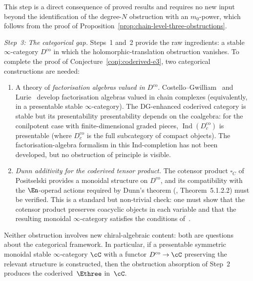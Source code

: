 \begin{remark}
This step is a direct consequence of proved results and requires
no new input beyond the identification of the degree-$N$ obstruction
with an $m_0$-power, which follows from the proof of
Proposition~\ref{prop:chain-level-three-obstructions}.

\emph{Step~3: The categorical gap.}
Steps~1 and~2 provide the raw ingredients:
a stable $\infty$-category $D^{\mathrm{co}}$ in which the
holomorphic-translation obstruction vanishes.
To complete the proof of Conjecture~\ref{conj:coderived-e3}, two
categorical constructions are needed:
\begin{enumerate}[label=\textup{(\alph*)}]
\item A theory of \emph{factorisation algebras valued in
 $D^{\mathrm{co}}$}. Costello--Gwilliam~\cite{CG17}
 and Lurie~\cite{HA} develop factorisation algebras valued in
 chain complexes (equivalently, in a presentable stable
 $\infty$-category). The DG-enhanced coderived category is
 stable but its presentability
 presentability depends on the coalgebra: for the conilpotent case with
 finite-dimensional graded pieces, $\operatorname{Ind}(D^{\mathrm{co}}_c)$ is
 presentable (where $D^{\mathrm{co}}_c$ is the full subcategory of
 compact objects). The factorisation-algebra formalism in
 this Ind-completion has not been developed, but no
 obstruction of principle is visible.
\item \emph{Dunn additivity for the coderived tensor product.}
 The cotensor product
 $\square_C$ of Positselski provides a monoidal structure on
 $D^{\mathrm{co}}$, and its compatibility with the
 $\En$-operad actions required by Dunn's theorem
 (\cite{HA}, Theorem~5.1.2.2) must be verified. This is a
 standard but non-trivial check: one must show that the
 cotensor product preserves coacyclic objects in each variable
 and that the resulting monoidal $\infty$-category satisfies
 the conditions of~\cite[Remark~5.1.2.4]{HA}.
\end{enumerate}
Neither obstruction involves new chiral-algebraic content: both
are questions about the categorical framework. In particular,
if a presentable symmetric monoidal stable $\infty$-category
$\cC$ with a functor $D^{\mathrm{co}} \to \cC$ preserving
the relevant structure is constructed, then the obstruction
absorption of Step~2 produces the coderived~$\Ethree$ in~$\cC$.


\end{remark}
